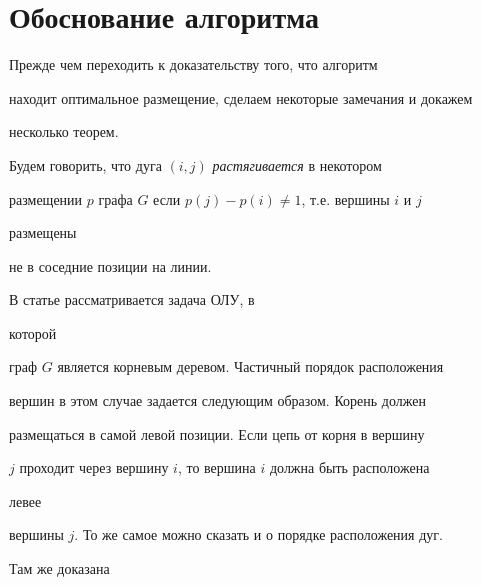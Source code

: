 \section{Обоснование алгоритма}





Прежде чем переходить к доказательству того, что алгоритм


находит оптимальное размещение, сделаем некоторые замечания и докажем


несколько теорем.





Будем говорить, что дуга $(i,j)$ {\em растягивается} в некотором


размещении $p$ графа $G$ если $p(j)-p(i)\ne 1$, т.е. вершины $i$ и $j$


размещены


не в соседние позиции на линии.





\begin{note} В статье \cite{Ado} рассматривается задача ОЛУ, в


которой


граф $G$ является корневым деревом. Частичный порядок расположения


вершин в этом случае задается следующим образом. Корень должен


размещаться в самой левой позиции. Если цепь от корня в вершину


$j$ проходит через вершину $i$, то вершина $i$ должна быть расположена


левее


вершины $j$. То же самое можно сказать и о порядке расположения дуг.


Там же доказана


\end{note}





